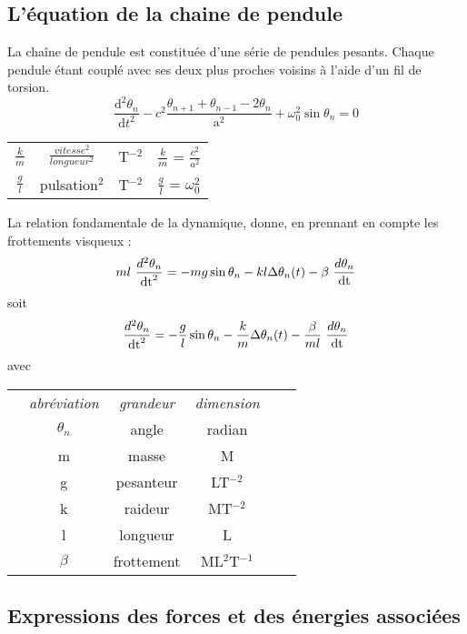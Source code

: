 \subsection{L'équation de la chaine de pendule}
\label{barreteau}
La chaîne de pendule est constituée d'une série de pendules pesants. Chaque pendule étant couplé avec ses deux plus proches voisins à l'aide d'un fil de torsion.\cite{chaine-pendule}
\[
\frac{\mathrm d^2\theta _n}{\mathrm d t^2} - c^2 \frac{\theta _{n+1} + \theta _{n-1} - 2 \theta _n}{\mathrm{a} ^2} + \omega _0 ^2 \sin \theta _n = 0
\]
%
\begin{center}
\begin{tabular}{cccc}
$\frac{k}{m}$ & $\frac{vitesse^2}{longueur^2}$ & T$^{-2}$ & $\frac{k}{m}$ = $\frac{c^2}{a^2}$ \\
$\frac{g}{l}$& pulsation$^2$ & T$^{-2}$ & $\frac{g}{l}$ = $\omega _0 ^2$ \\
\end{tabular}
\end{center}

La relation fondamentale de la dynamique, donne, en prennant en compte les frottements visqueux :
\[
m l\ \frac{d^2 \theta _n}{\dt^2} =  - m g \sin{\theta _n}  -  k l \Delta \theta _n(t)  -  \beta\ \frac{d \theta _n}{\dt}
\]
soit
\[
\frac{d^2 \theta _n}{\dt^2} =  - \frac{g}{l} \sin{\theta _n}  -  \frac{k}{m} \Delta \theta _n(t)  - \frac{\beta}{ml}\ \frac{d \theta _n}{\dt}
\]
avec
\begin{center}
\begin{tabular}{cccccc}
 & {\it abréviation} & {\it grandeur} & {\it dimension} &  \\
 & $\theta _n$ & angle & radian &  \\
 & m & masse & M &  \\
 & g & pesanteur & LT$^{-2}$ &  \\
 & k & raideur & MT$^{-2}$ &  \\
 & l & longueur & L &  \\
 & $\beta$ & frottement & ML$^{2}$T$^{-1}$ &  \\
\end{tabular}
\end{center}
%
\subsection{Expressions des forces et des énergies associées}

